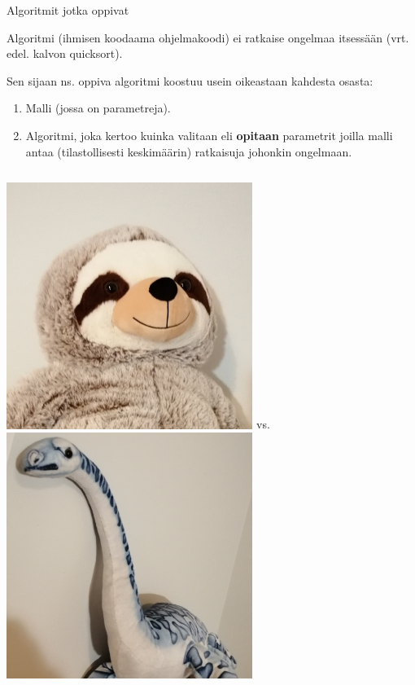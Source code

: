 \documentclass[presentation]{beamer}
\begin{document}
\begin{frame}{Algoritmit jotka oppivat}
    
    Algoritmi (ihmisen koodaama ohjelmakoodi) ei ratkaise ongelmaa itsessään (vrt. edel. kalvon quicksort).
    \pause
    
    Sen sijaan ns. oppiva algoritmi koostuu usein oikeastaan kahdesta osasta:
    \pause
    \begin{enumerate}
        \item Malli (jossa on parametreja).
        \item Algoritmi, joka kertoo kuinka valitaan eli \textbf{opitaan} parametrit joilla malli antaa (tilastollisesti keskimäärin) ratkaisuja johonkin  ongelmaan.
    \end{enumerate}
    \pause
    	\begin{columns}[]
			\centering
				\includegraphics[width=0.6\textwidth]{lasse.jpg}
	        vs.
		    \centering
				\includegraphics[width=0.6\textwidth]{nessie.jpg}

	\end{columns}
    
\end{frame}
\end{document}
